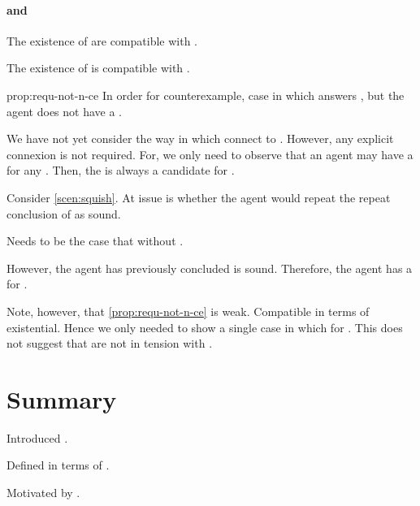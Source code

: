 \paragraph*{ and \issueConstraint{}}

\begin{note}
  The existence of  are compatible with \issueConstraint{}.

  \begin{observation}
    \label{prop:requ-not-n-ce}
    The existence of  is compatible with \issueConstraint{}.
  \end{observation}

  \begin{motivation}{prop:requ-not-n-ce}
    In order for counterexample, case in which \ros{} answers \qWhyV{}, but the agent does not have a \wit{}.

    We have not yet consider the way in which  connect to \qWhyV{}.
    However, any explicit connexion is not required.
    For, we only need to observe that an agent may have a \wit{} for any \requ{}.
    Then, the \wit{} is always a candidate for \qHowV{}.

    Consider \autoref{scen:squish}.
    At issue is whether the agent would repeat the repeat conclusion of \sqE{} as sound.

    Needs to be the case that \ros{} without \wit{}.

    However, the agent has previously concluded \sqE{} is sound.
    Therefore, the agent has a \wit{} for \ros{}.
  \end{motivation}

  Note, however, that \autoref{prop:requ-not-n-ce} is weak.
  Compatible in terms of existential.
  Hence we only needed to show a single case in which \wit{} for \requ{}.
  This does not suggest that  are not in tension with \issueConstraint{}.
\end{note}

\section*{Summary}

\begin{note}
  Introduced .

  Defined in terms of \tC{}.

  Motivated by \tC{}.
\end{note}



